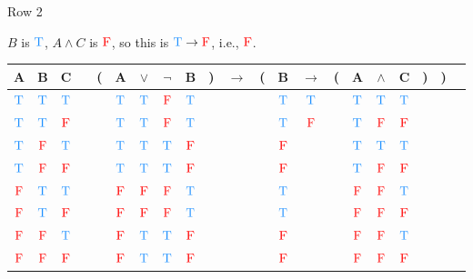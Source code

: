 \documentclass[
  ignorenonframetext,
]{beamer}
\renewcommand{\,}{\text{, }}
\def\True{\textcolor{dodgerblue}{\text{T}}}
\def\False{\textcolor{red}{\text{F}}}
\begin{document}
\begin{frame}{Row 2}
\protect\hypertarget{row-2}{}

\(B\) is \(\True\), \(A \wedge C\) is \(\False\), so this is
\(\True \rightarrow \False\), i.e., \(\False\).

\begin{center}
\bigskip
\begin{tabular}{@{ }c@{ }@{ }c@{ }@{ }c | c@{ }@{}c@{}@{ }c@{ }@{ }c@{ }@{ }c@{ }@{ }c@{ }@{}c@{}@{ }c@{ }@{}c@{}@{ }c@{ }@{ }c@{ }@{}c@{}@{ }c@{ }@{ }c@{ }@{ }c@{ }@{}c@{}@{}c@{}@{ }c}
A & B & C &  & ( & A & $\vee$ & $\neg$ & B & ) & $\rightarrow$ & ( & B & $\rightarrow$ & ( & A & $\wedge$ & C & ) & ) & \\
\hline 
 $\True$ & $\True$ & $\True$ &  &  & $\True$ & $\True$ & $\False$ & $\True$ &  &&  & $\True$ & $\True$ &  & $\True$ & $\True$ & $\True$ &  &  & \\
 $\True$ & $\True$ & $\False$ &  &  & $\True$ & $\True$ & $\False$ & $\True$ &  &&  & $\True$ & $\False$ &  & $\True$ & $\False$ & $\False$ &  &  & \\
 $\True$ & $\False$ & $\True$ &  &  & $\True$ & $\True$ & $\True$ & $\False$ &  &&  & $\False$ &&  & $\True$ & $\True$ & $\True$ &  &  & \\
 $\True$ & $\False$ & $\False$ &  &  & $\True$ & $\True$ & $\True$ & $\False$ &  &&  & $\False$ &&  & $\True$ & $\False$ & $\False$ &  &  & \\
 $\False$ & $\True$ & $\True$ &  &  & $\False$ & $\False$ & $\False$ & $\True$ &  &&  & $\True$ &&  & $\False$ & $\False$ & $\True$ &  &  & \\
 $\False$ & $\True$ & $\False$ &  &  & $\False$ & $\False$ & $\False$ & $\True$ &  &&  & $\True$ &&  & $\False$ & $\False$ & $\False$ &  &  & \\
 $\False$ & $\False$ & $\True$ &  &  & $\False$ & $\True$ & $\True$ & $\False$ &  &&  & $\False$ &&  & $\False$ & $\False$ & $\True$ &  &  & \\
 $\False$ & $\False$ & $\False$ &  &  & $\False$ & $\True$ & $\True$ & $\False$ &  &&  & $\False$ &&  & $\False$ & $\False$ & $\False$ &  &  & \\
\end{tabular}
\bigskip
\end{center}

\end{frame}
\end{document}

